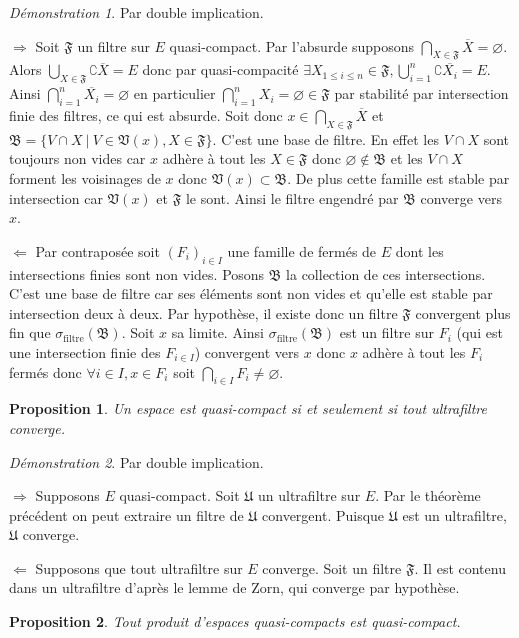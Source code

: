 \documentclass[a4paper, 11pt, french]{book}
\newenvironment{itemise}{\itemize}{\enditemize}
\theoremstyle{plain} %
\newtheorem{proposition}{Proposition}
\theoremstyle{definition} %
\theoremstyle{remark} %
\newtheorem*{demonstration}{Démonstration}
\newcommand{\1}{\mathds{1}}
\newcommand\vide{\varnothing}
\renewcommand{\frak}[1]{\mathfrak{#1}}
\newcommand\ens[2]{\{#1 \ |\ #2\}}
\newcommand\equivalence[3]{
	\begin{demonstration}
		#1
		\begin{itemise}
			\item[$\Longrightarrow$] #2
			\item[$\Longleftarrow$] #3
		\end{itemise}
	\end{demonstration}
}
\begin{document}
\equivalence{Par double implication.}{
	Soit $\frak{F}$ un filtre sur $E$ quasi-compact.
	Par l'absurde supposons $\bigcap_{X\in\frak{F}}\overline{X}=\vide$.
	Alors $\bigcup_{X\in\frak{F}}\complement\overline{X}=E$ donc par quasi-compacité $\exists X_{1\leqslant i\leqslant n}\in\frak{F}, \bigcup_{i=1}^n\complement\overline{X_i}=E$.
	Ainsi $\bigcap_{i=1}^n\overline{X_i}=\vide$ en particulier $\bigcap_{i=1}^nX_i=\vide\in\frak{F}$ par stabilité par intersection finie des filtres, ce qui est absurde.
	Soit donc $x\in\bigcap_{X\in\frak{F}}\overline{X}$ et $\frak{B}=\ens{V\cap X}{V\in\frak{V}(x), X\in\frak{F}}$.
	C'est une base de filtre.
	En effet les $V\cap X$ sont toujours non vides car $x$ adhère à tout les $X\in\frak{F}$ donc $\vide\notin\frak{B}$ et les $V\cap X$ forment les voisinages de $x$ donc $\frak{V}(x)\subset\frak{B}$.
	De plus cette famille est stable par intersection car $\frak{V}(x)$ et $\frak{F}$ le sont.
	Ainsi le filtre engendré par $\frak{B}$ converge vers $x$.
}{
	Par contraposée soit $(F_i)_{i\in I}$ une famille de fermés de $E$ dont les intersections finies sont non vides.
	Posons $\frak{B}$ la collection de ces intersections.
	C'est une base de filtre car ses éléments sont non vides et qu'elle est stable par intersection deux à deux.
	Par hypothèse, il existe donc un filtre $\frak{F}$ convergent plus fin que $\sigma_\text{filtre}(\frak{B})$.
	Soit $x$ sa limite.
	Ainsi $\sigma_\text{filtre}(\frak{B})$ est un filtre sur $F_i$ (qui est une intersection finie des $F_{i\in I}$) convergent vers $x$ donc $x$ adhère à tout les $F_i$ fermés donc $\forall i\in I, x\in F_i$ soit $\bigcap_{i\in I}F_i\neq\vide$.
}

\begin{proposition}
	Un espace est quasi-compact si et seulement si tout ultrafiltre converge.
\end{proposition}

\equivalence{Par double implication.}{
	Supposons $E$ quasi-compact.
	Soit $\frak{U}$ un ultrafiltre sur $E$.
	Par le théorème précédent on peut extraire un filtre de $\frak{U}$ convergent.
	Puisque $\frak{U}$ est un ultrafiltre, $\frak{U}$ converge.
}{
	Supposons que tout ultrafiltre sur $E$ converge.
	Soit un filtre $\frak{F}$.
	Il est contenu dans un ultrafiltre d'après le lemme de Zorn, qui converge par hypothèse.
}

\begin{proposition}
	Tout produit d’espaces quasi-compacts est quasi-compact.
\end{proposition}
\end{document}
